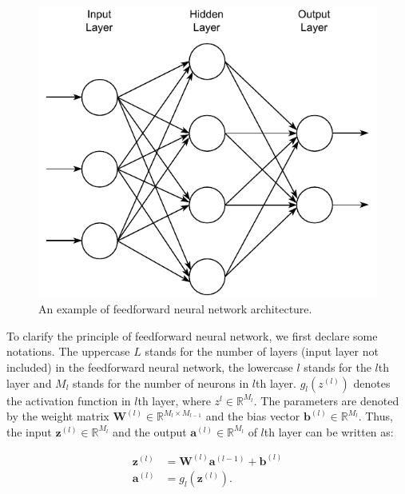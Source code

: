 \documentclass[
	parskip, 			   %
	twoside, 			   %
	DIV=14, 			   %
	BCOR=15.0mm, 		   %
	headsepline, 		   %
	open=right, 		   %
	captions=tableheading, %
	bibliography=totoc,    %
	numbers=noenddot       %
]{scrreprt}
\begin{document}
\clearpage
\begin{figure}[h!]
    \centering
    \includegraphics[scale=1]{figures/feedforward_neural_network.pdf}
    \caption{An example of feedforward neural network architecture.}
    \label{fig:feedforward}
\end{figure}

To clarify the principle of feedforward neural network, we first declare some notations. The uppercase $L$ stands for the number of layers (input layer not included) in the feedforward neural network, the lowercase $l$ stands for the $l$th layer and $M_{l}$ stands for the number of neurons in $l$th layer. $g_{l}(z^{(l)})$ denotes the activation function in $l$th layer, where $z^{l} \in \mathbb{R}^{M_{l}}$. The parameters are denoted by the weight matrix $\mathbf{W}^{(l)} \in \mathbb{R}^{M_{l} \times M_{l-1}}$ and the bias vector $\mathbf{b}^{(l)} \in \mathbb{R}^{M_{l}}$. Thus, the input $\mathbf{z}^{(l)} \in \mathbb{R}^{M_{l}}$ and the output $\mathbf{a}^{(l)} \in \mathbb{R}^{M_{l}}$ of $l$th layer can be written as:

\begin{equation}
    \label{eq:input_output_neuron}
    \begin{aligned}
    \mathbf{z}^{(l)} &= \mathbf{W}^{(l)} \mathbf{a}^{(l-1)} + \mathbf{b}^{(l)}\\
    \mathbf{a}^{(l)} &= g_{l}(\mathbf{z}^{(l)}).
    \end{aligned}
\end{equation}
\end{document}
